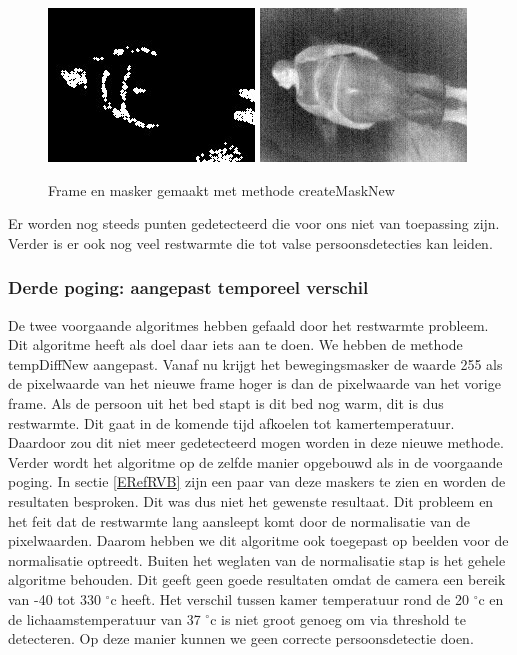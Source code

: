 \begin{figure}[hbp]
	\includegraphics[scale=0.65]{MaskMetDif}
	\includegraphics[scale=0.65]{ImgMetDif}
	\caption{Frame en masker gemaakt met methode createMaskNew}
	\label{imgCMN}
\end{figure} 
Er worden nog steeds punten gedetecteerd die voor ons niet van toepassing zijn. Verder is er ook nog veel restwarmte die tot valse persoonsdetecties kan leiden.


\subsubsection{Derde poging: aangepast temporeel verschil}
De twee voorgaande algoritmes hebben gefaald door het restwarmte probleem. Dit algoritme heeft als doel daar iets aan te doen. We hebben de methode tempDiffNew aangepast. Vanaf nu krijgt het bewegingsmasker de waarde 255 als de pixelwaarde van het nieuwe frame hoger is dan de pixelwaarde van het vorige frame. Als de persoon uit het bed stapt is dit bed nog warm, dit is dus restwarmte. Dit gaat in de komende tijd afkoelen tot kamertemperatuur. Daardoor zou dit niet meer gedetecteerd mogen worden in deze nieuwe methode. Verder wordt het algoritme op de zelfde manier opgebouwd als in de voorgaande poging. In sectie \ref{ERefRVB} zijn een paar van deze maskers te zien en worden de resultaten besproken. Dit was dus niet het gewenste resultaat. Dit probleem en het feit dat de restwarmte lang aansleept komt door de normalisatie van de pixelwaarden. Daarom hebben we dit algoritme ook toegepast op beelden voor de normalisatie optreedt. Buiten het weglaten van de normalisatie stap is het gehele algoritme behouden. Dit geeft geen goede resultaten omdat de camera een bereik van -40 tot 330 $^\circ$c heeft. Het verschil tussen kamer temperatuur rond de 20 $^\circ$c en de lichaamstemperatuur van 37 $^\circ$c is niet groot genoeg om via threshold te detecteren. Op deze manier kunnen we geen correcte persoonsdetectie doen. 

